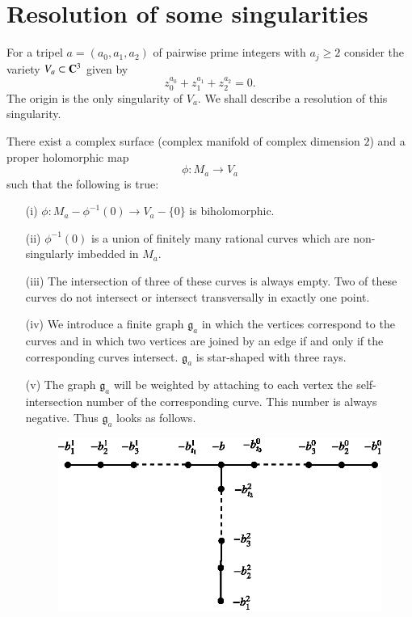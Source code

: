 \section{Resolution of some singularities}\label{art11-sec4}

For a tripel $a=(a_{0},a_{1},a_{2})$ of pairwise prime integers with $a_{j}\geq 2$ consider the variety $V_{a}\subset \mathbf{C}^{3}$ given by
\setcounter{equation}{0}
\begin{equation}
z^{a_{0}}_{0}+z^{a_{1}}_{1}+z^{a_{2}}_{2}=0.\label{art11-sec4-eq1}
\end{equation}\pageoriginale
The origin is the only singularity of $V_{a}$. We shall describe a resolution of this singularity.

\begin{theorem*}
There exist a complex surface (complex manifold of complex dimension $2$) and a proper holomorphic map
$$
\phi : M_{a}\to V_{a}
$$
such that the following is true:
\begin{itemize}
\item[\rm(i)] $\phi : M_{a}-\phi^{-1}(0)\to V_{a}-\{0\}$ is biholomorphic.

\item[\rm(ii)] $\phi^{-1}(0)$ is a union of finitely many rational curves which are non-singularly imbedded in $M_{a}$.

\item[\rm(iii)] The intersection of three of these curves is always empty. Two of these curves do not intersect or intersect transversally in exactly one point.

\item[\rm(iv)] We introduce a finite graph $\mathfrak{g}_{a}$ in which the vertices correspond to the curves and in which two vertices are joined by an edge if and only if the corresponding curves intersect. $\mathfrak{g}_{a}$ is star-shaped with three rays.

\item[\rm(v)] The graph $\mathfrak{g}_{a}$ will be weighted by attaching to each vertex the self-intersection number of the corresponding curve. This number is always negative. Thus $\mathfrak{g}_{a}$ looks as follows.
\begin{figure}[H]
\centering
\includegraphics{figures/fig9.eps}
\end{figure}


\end{itemize}
\end{theorem*}
